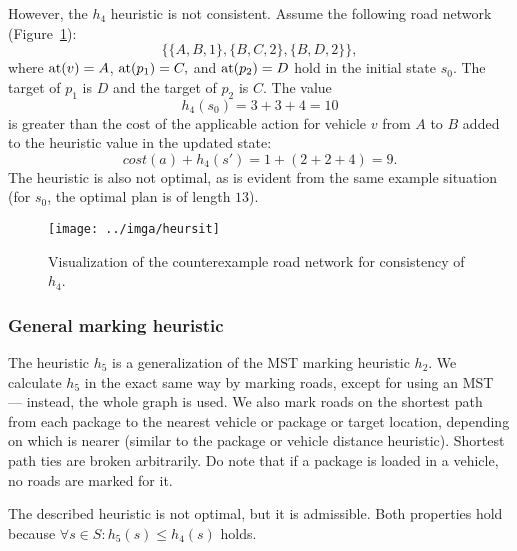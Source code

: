 However, the $h_4$ heuristic is not consistent. Assume the following road network (Figure~\ref{fig:heursit}):
$$\{\{A, B, 1\}, \{B, C, 2\}, \{B, D, 2\}\},$$
where $\textrm{at}(v) = A$, $\textrm{at}(p_1) = C,$ and $\textrm{at}(p_2) = D$
hold in the initial state $s_0$.
The target of $p_1$ is $D$ and the target of $p_2$ is $C$.
The value
$$h_4(s_0) = 3+3+4 = 10$$ is greater than the cost
of the applicable \drive{} action for vehicle $v$ from $A$ to $B$
added to the heuristic value in the updated state:
$$cost(a) + h_4(s') = 1 + (2+2+4) = 9.$$
The heuristic is also not optimal, as is evident from the same
example situation (for $s_0$, the optimal plan is of length $13$).

\begin{figure}[tb]
\centering
\texttt{[image: ../imga/heursit]}
\caption{Visualization of the counterexample road network
for consistency of $h_4$.}
\label{fig:heursit}
\end{figure}

\subsubsection{General marking heuristic}\label{sfa5}

The heuristic $h_5$ is a generalization of the MST marking heuristic $h_2$. We calculate $h_5$ in the exact same way by marking roads,
except for
using an MST --- instead, the whole graph is used.
We also mark roads on the shortest path from each package to the nearest
vehicle or package or target location, depending on which is nearer (similar
to the package or vehicle distance heuristic).
Shortest path ties are broken arbitrarily.
Do note that if a package is loaded in a vehicle, no roads are marked for it.

The described heuristic is not optimal, but it is admissible.
Both properties hold because $\forall s \in S : h_5(s) \leq h_4(s)$ holds.

